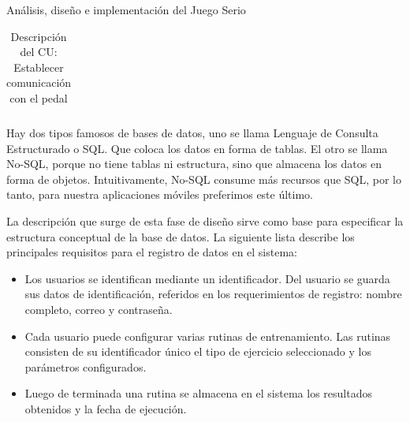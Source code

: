 \begin{thesischapter}{2} {Análisis, diseño e implementación del Juego Serio}
\begin{center}
\begin{table}
\begin{tabularx}{\textwidth}{|X|X|}
            \end{tabularx}

            \caption{Descripción del CU: Establecer comunicación con el pedal}
        \end{table}
    \end{center}
    
    \newpage
    Hay dos tipos famosos de bases de datos, uno se llama Lenguaje de Consulta Estructurado o SQL. Que coloca 
    los datos en forma de tablas. El otro se llama No-SQL, porque no tiene tablas ni estructura, sino que almacena los 
    datos en forma de objetos. Intuitivamente, No-SQL consume más recursos que SQL, por lo tanto, para nuestra aplicaciones 
    móviles preferimos este último.

    \vspace{10pt}
    La descripción que surge de esta fase de diseño sirve como base para especificar la estructura conceptual de la base de datos. 
    La siguiente lista describe los principales requisitos para el registro de datos en el sistema:
    \begin{itemize}
        \item Los usuarios se identifican mediante un identificador. Del usuario se guarda sus datos de identificación, 
        referidos en los requerimientos de registro: nombre completo, correo y contraseña.
        \item Cada usuario puede configurar varias rutinas de entrenamiento. Las rutinas consisten de su identificador 
        único el tipo de ejercicio seleccionado y los parámetros configurados.   
        \item Luego de terminada una rutina se almacena en el sistema los resultados obtenidos y la fecha de ejecución. 
    \end{itemize}   
    

\end{thesischapter}
